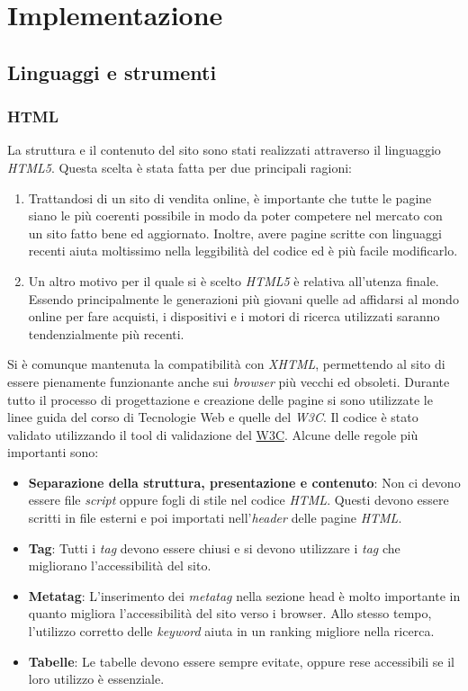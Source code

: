 \section{Implementazione}\label{sec:implementazione}

\subsection{Linguaggi e strumenti}
\subsubsection{HTML}
La struttura e il contenuto del sito sono stati realizzati attraverso il linguaggio \textit{HTML5}. Questa scelta è stata fatta per due principali ragioni:
\begin{enumerate}
	\item Trattandosi di un sito di vendita online, è importante che tutte le pagine siano le più coerenti possibile in modo da poter competere nel mercato con un sito fatto bene ed aggiornato. Inoltre, avere pagine scritte con linguaggi recenti aiuta moltissimo nella leggibilità del codice ed è più facile modificarlo.
	\item Un altro motivo per il quale si è scelto \textit{HTML5} è relativa all'utenza finale. Essendo principalmente le generazioni più giovani quelle ad affidarsi al mondo online per fare acquisti, i dispositivi e i motori di ricerca utilizzati saranno tendenzialmente più recenti.
	\end{enumerate}
	Si è comunque mantenuta la compatibilità con \textit{XHTML}, permettendo al sito di essere pienamente funzionante anche sui \textit{browser} più vecchi ed obsoleti. Durante tutto il processo di progettazione e creazione delle pagine si sono utilizzate le linee guida del corso di Tecnologie Web e quelle del \textit{W3C}. Il codice è stato validato utilizzando il tool di validazione del \href{https://validator.w3.org/}{W3C}.
Alcune delle regole più importanti sono:
\begin{itemize}
	\item \textbf{Separazione della struttura, presentazione e contenuto}: Non ci devono essere file \textit{script} oppure fogli di stile nel codice \textit{HTML}. Questi devono essere scritti in file esterni e poi importati nell’\textit{header} delle pagine \textit{HTML}.
	\item \textbf{Tag}: Tutti i \textit{tag} devono essere chiusi e si devono utilizzare i \textit{tag} che migliorano l'accessibilità del sito.
	\item \textbf{Metatag}: L’inserimento dei \textit{metatag} nella sezione head è molto importante in quanto migliora l’accessibilità del sito verso i browser. Allo stesso tempo, l’utilizzo corretto delle \textit{keyword} aiuta in un ranking migliore nella ricerca.
	\item \textbf{Tabelle}: Le tabelle devono essere sempre evitate, oppure rese accessibili se il loro utilizzo è essenziale.
\end{itemize}

